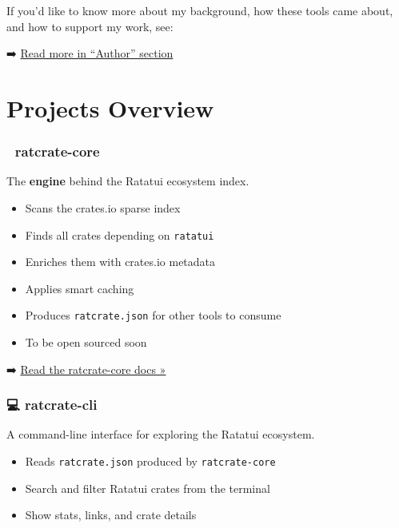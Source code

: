 \documentclass[
  letterpaper,
  DIV=11,
  numbers=noendperiod]{scrreprt}
\providecommand{\tightlist}{%
  \setlength{\itemsep}{0pt}\setlength{\parskip}{0pt}}
\begin{document}
If you'd like to know more about my background, how these tools came
about, and how to support my work, see:

➡️ \href{about-author.qmd}{Read more in ``Author'' section}


\chapter{Projects Overview}\label{projects-overview}

\subsection{🐀 ratcrate-core}\label{ratcrate-core}

The \textbf{engine} behind the Ratatui ecosystem index.

\begin{itemize}
\item
  Scans the crates.io sparse index\\
\item
  Finds all crates depending on \texttt{ratatui}\\
\item
  Enriches them with crates.io metadata\\
\item
  Applies smart caching\\
\item
  Produces \texttt{ratcrate.json} for other tools to consume
\item
  To be open sourced soon
\end{itemize}

➡️ \href{rat-core/index.qmd}{Read the ratcrate-core docs »}

\subsection{💻 ratcrate-cli}\label{ratcrate-cli}

A command-line interface for exploring the Ratatui ecosystem.

\begin{itemize}
\tightlist
\item
  Reads \texttt{ratcrate.json} produced by \texttt{ratcrate-core}\\
\item
  Search and filter Ratatui crates from the terminal\\
\item
  Show stats, links, and crate details
\end{itemize}
\end{document}
